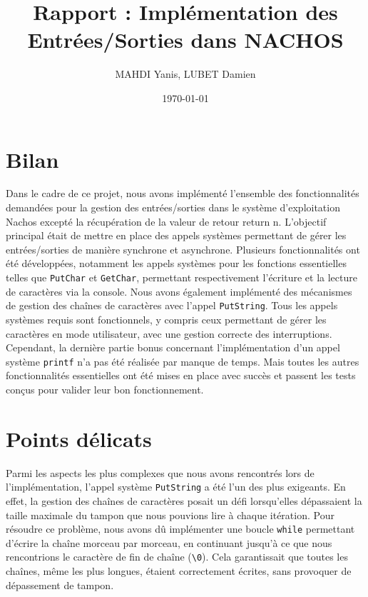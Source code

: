 \documentclass[a4paper,11pt]{article}
\title{Rapport : Implémentation des Entrées/Sorties dans NACHOS}
\author{MAHDI Yanis, LUBET Damien}
\date{\today}
\begin{document}
\maketitle
\tableofcontents


\section{Bilan}
Dans le cadre de ce projet, nous avons implémenté l'ensemble des fonctionnalités demandées pour la gestion des entrées/sorties dans le système d'exploitation Nachos excepté la récupération de la valeur de retour return n. L'objectif principal était de mettre en place des appels systèmes permettant de gérer les entrées/sorties de manière synchrone et asynchrone.
Plusieurs fonctionnalités ont été développées, notamment les appels systèmes pour les fonctions essentielles telles que \texttt{PutChar} et \texttt{GetChar}, permettant respectivement l'écriture et la lecture de caractères via la console. Nous avons également implémenté des mécanismes de gestion des chaînes de caractères avec l'appel \texttt{PutString}.
Tous les appels systèmes requis sont fonctionnels, y compris ceux permettant de gérer les caractères en mode utilisateur, avec une gestion correcte des interruptions. 
Cependant, la dernière partie bonus concernant l'implémentation d'un appel système \texttt{printf} n'a pas été réalisée par manque de temps. 
Mais toutes les autres fonctionnalités essentielles ont été mises en place avec succès et passent les tests conçus pour valider leur bon fonctionnement.



\section{Points délicats}

Parmi les aspects les plus complexes que nous avons rencontrés lors de l'implémentation, l'appel système \texttt{PutString} a été l'un des plus exigeants. 
En effet, la gestion des chaînes de caractères posait un défi lorsqu'elles dépassaient la taille maximale du tampon que nous pouvions lire à chaque itération. 
Pour résoudre ce problème, nous avons dû implémenter une boucle \texttt{while} permettant d'écrire la chaîne morceau par morceau, en continuant jusqu'à ce que nous 
rencontrions le caractère de fin de chaîne (\texttt{\textbackslash0}). Cela garantissait que toutes les chaînes, même les plus longues, étaient correctement écrites, sans provoquer de dépassement de tampon.
\end{document}
